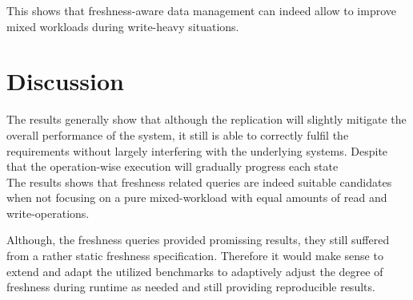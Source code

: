This shows that freshness-aware data management can indeed allow to improve mixed workloads during write-heavy situations.









\section{Discussion}
\label{sec:discussion}

The results generally show that although the replication will slightly mitigate the overall performance of the system, it still is able to correctly fulfil the 
requirements without largely interfering with the underlying systems. 
Despite that the operation-wise execution will gradually progress each state\\

The results shows that freshness related queries are indeed suitable candidates when not focusing on a pure mixed-workload with equal amounts of read and write-operations.

Although, the freshness queries provided promissing results, they still suffered from a rather static freshness specification. 
Therefore it would make sense to extend and adapt the utilized benchmarks to adaptively adjust the degree of freshness during runtime
as needed and still providing reproducible results.







